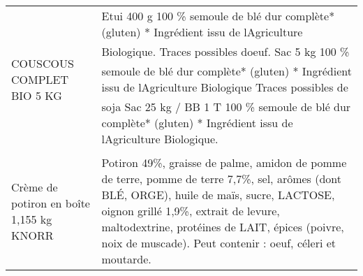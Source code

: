 \begin{longtable}{p{5cm}p{10cm}}
                                                                                COUSCOUS COMPLET BIO 5 KG &                                                                                                                                                                                                                                                                                                                                                                                                                                                                                                                                                                                                                                                       Etui 400 g  100 \% semoule de blé dur complète* (gluten)  * Ingrédient issu de lAgriculture Biologique.  Traces possibles doeuf.  Sac 5 kg  100 \% semoule de blé dur complète* (gluten)  * Ingrédient issu de lAgriculture Biologique  Traces possibles de soja  Sac 25 kg / BB 1 T  100 \% semoule de blé dur complète* (gluten)  * Ingrédient issu de lAgriculture Biologique. \\
                                                                 Crème de potiron en boîte 1,155 kg KNORR &                                                                                                                                                                                                                                                                                                                                                                                                                                                                                                                                                                                                                                                                                                                                          Potiron 49\%, graisse de palme, amidon de pomme de terre, pomme de terre 7,7\%, sel, arômes (dont BLÉ, ORGE), huile de maïs, sucre, LACTOSE, oignon grillé 1,9\%, extrait de levure, maltodextrine, protéines de LAIT, épices (poivre, noix de muscade). Peut contenir : oeuf, céleri et moutarde. \\

\end{longtable}
